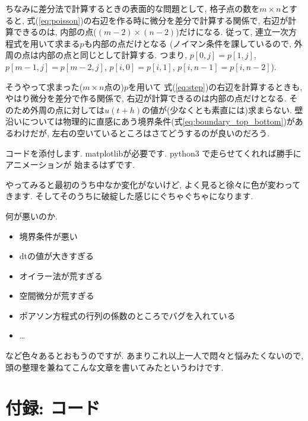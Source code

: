\documentclass[12pt,dvipdfmx]{article}
\begin{document}
ちなみに差分法で計算するときの表面的な問題として,
格子点の数を$m \times n$とすると,
式(\ref{eq:poisson})の右辺を作る時に微分を差分で計算する関係で,
右辺が計算できるのは, 内部の点($(m - 2) \times (n - 2)$)だけになる.
従って, 連立一次方程式を用いて求まる$p$も内部の点だけとなる
(ノイマン条件を課しているので,
外周の点は内部の点と同じとして計算する.
つまり, $p[0,j] = p[1,j]$, $p[m-1,j] = p[m-2,j]$, $p[i,0] = p[i,1]$, $p[i,n-1] = p[i,n-2]$).

そうやって求まった($m \times n$点の)$p$を用いて
式(\ref{eq:step})の右辺を計算するときも, やはり微分を差分で作る関係で,
右辺が計算できるのは内部の点だけとなる.
そのため外周の点に対しては$u(t + h)$の値が(少なくとも素直には)求まらない.
壁沿いについては物理的に直感にあう境界条件(式\ref{eq:boundary_top_bottom})があるわけだが, 左右の空いているところはさてどうするのが良いのだろう.

コードを添付します.
matplotlibが必要です.
python3 で走らせてくれれば勝手にアニメーションが
始まるはずです.

やってみると最初のうち中なか変化がないけど,
よく見ると徐々に色が変わってきます.
そしてそのうちに破綻した感じにぐちゃぐちゃになります.

何が悪いのか.

\begin{itemize}
\item 境界条件が悪い
\item dtの値が大きすぎる
\item オイラー法が荒すぎる
\item 空間微分が荒すぎる
\item ポアソン方程式の行列の係数のところでバグを入れている
\item \ldots 
\end{itemize}
など色々あるとおもうのですが.
あまりこれ以上一人で悶々と悩みたくないので,
頭の整理を兼ねてこんな文章を書いてみたというわけです.

\section{付録: コード}

\end{document}
